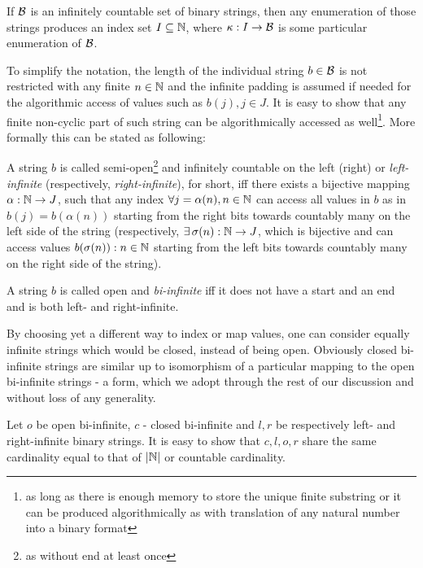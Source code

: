 \begin{lemma}If $\mathcal{B}$ is an infinitely countable set of binary strings, then any enumeration of those strings produces an index set $I\subseteq \mathbb{N}$, where $\kappa : I \to \mathcal{B}$ is some particular enumeration of $\mathcal{B}$.\end{lemma}

To simplify the notation, the length of the individual string $b \in \mathcal{B}$ is not restricted with any finite $n \in \mathbb{N}$ and the infinite padding is assumed if needed for the algorithmic access of values such as $b(j), j \in J$. It is easy to show that any finite non-cyclic part of such string can be algorithmically accessed as well\footnote{as long as there is enough memory to store the unique finite substring or it can be produced algorithmically as with translation of any natural number into a binary format}. More formally this can be stated as following:

\begin{definition}A string $b$ is called semi-open\footnote{as without end at least once} and infinitely countable on the left (right) or \textit{left-infinite} (respectively, \textit{right-infinite}), for short, iff there exists a bijective mapping $\alpha : \mathbb{N} \to J$, such that any index $\forall j = \alpha(n), n \in \mathbb{N}$ can access all values in $b$ as in $b(j) = b(\alpha(n))$ starting from the right bits towards countably many on the left side of the string (respectively, $\exists\, \sigma(n): \mathbb{N} \to J$, which is bijective and can access values $b(\sigma(n)): n \in \mathbb{N}$ starting from the left bits towards countably many on the right side of the string).\end{definition}


\begin{definition}A string $b$ is called open and \textit{bi-infinite} iff it does not have a start and an end and is both left- and right-infinite.\end{definition}

By choosing yet a different way to index or map values, one can consider equally infinite strings which would be closed, instead of being open. Obviously closed bi-infinite strings are similar up to isomorphism of a particular mapping to the open bi-infinite strings - a form, which we adopt through the rest of our discussion and without loss of any generality.

\begin{lemma}Let $o$ be open bi-infinite, $c$ - closed bi-infinite and $l, r$ be respectively left- and right-infinite binary strings. It is easy to show that $c,l,o,r$ share the same cardinality equal to that of $|\mathbb{N}|$ or countable cardinality.\end{lemma} 

